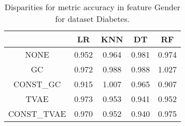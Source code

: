\begin{table}
\caption{Disparities for metric accuracy in feature Gender for dataset Diabetes.}
\label{tab:disp-DIABETES-Gender-accuracy}
\begin{tabular}{ccccc}
\toprule
 & LR & KNN & DT & RF \\
\midrule
NONE & 0.952 & 0.964 & 0.981 & 0.974 \\
GC & 0.972 & 0.988 & 0.988 & 1.027 \\
CONST\_GC & 0.915 & 1.007 & 0.965 & 0.907 \\
TVAE & 0.973 & 0.953 & 0.941 & 0.952 \\
CONST\_TVAE & 0.970 & 0.952 & 0.940 & 0.975 \\
\bottomrule
\end{tabular}
\end{table}

